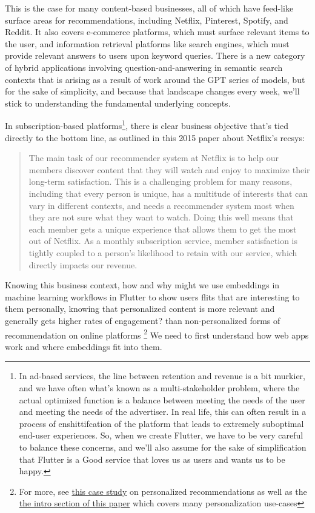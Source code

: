 \documentclass[11pt, table]{diazessay} %
\begin{document}
\begin{sloppypar}
This is the case for many content-based businesses, all of which have feed-like surface areas for recommendations, including Netflix, Pinterest, Spotify, and Reddit.  It also covers e-commerce platforms, which must surface relevant items to the user, and information retrieval platforms like search engines, which must provide relevant answers to users upon keyword queries. There is a new category of hybrid applications involving question-and-answering in semantic search contexts that is arising as a result of work around the GPT series of models, but for the sake of simplicity, and because that landscape changes every week, we'll stick to understanding the fundamental underlying concepts.

In subscription-based platforms\footnote{In ad-based services, the line between retention and revenue is a bit murkier, and we have often what's known as a multi-stakeholder problem, where the actual optimized function is a balance between meeting the needs of the user and meeting the needs of the advertiser\citep{zheng2017multi}.  In real life, this can often result in a process of enshittifcation\citep{doctorow_2023} of the platform that leads to extremely suboptimal end-user experiences. So, when we create Flutter, we have to be very careful to balance these concerns, and we'll also assume for the sake of simplification that Flutter is a Good service that loves us as users and wants us to be happy.}, there is clear business objective that's tied directly to the bottom line, as outlined in this 2015 paper \citep{steck2021deep}  about Netflix's recsys:

\begin{quote}

The main task of our recommender system at Netflix is to help our members discover content that they will watch and enjoy to maximize their long-term satisfaction. This is a challenging problem for many reasons, including that every person is unique, has a multitude of interests that can vary in different contexts, and needs a recommender system most when they are not sure what they want to watch. Doing this well means that each member gets a unique experience that allows them to get the most out of Netflix. As a monthly subscription service, member satisfaction is tightly coupled to a person’s likelihood to retain with our service, which directly impacts our revenue.
\end{quote}

Knowing this business context, how and why might we use embeddings in machine learning workflows in Flutter to show users flits that are interesting to them personally, knowing that personalized content is more relevant and generally gets higher rates of engagement?\citep{jannach2010recommender}  than non-personalized forms of recommendation on online platforms \footnote{For more, see  \href{http://www.recommenderbook.net/media/Recommender_Systems_An_Introduction_Chapter08_Case_study.pdf}{this case study} on personalized recommendations as well as  the \href{https://www.arxiv-vanity.com/papers/1906.03109/}{the intro section of this paper} which covers many personalization use-cases}  We need to first understand how web apps work and where embeddings fit into them.


\end{sloppypar}
\end{document}
